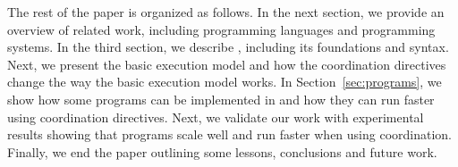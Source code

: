 The rest of the paper is organized as follows. In the next section, we provide an overview of related work, including
programming languages and programming systems. In the third section, we describe \lang, including its foundations and syntax.
Next, we present the basic execution model and how the coordination directives change the way the basic execution model works.
In Section~\ref{sec:programs}, we show how some programs can be implemented in \lang and how they can run faster using coordination directives.
Next, we validate our work with experimental results showing that \lang programs scale well and run faster when using coordination.
Finally, we end the paper outlining some lessons, conclusions and future work.
